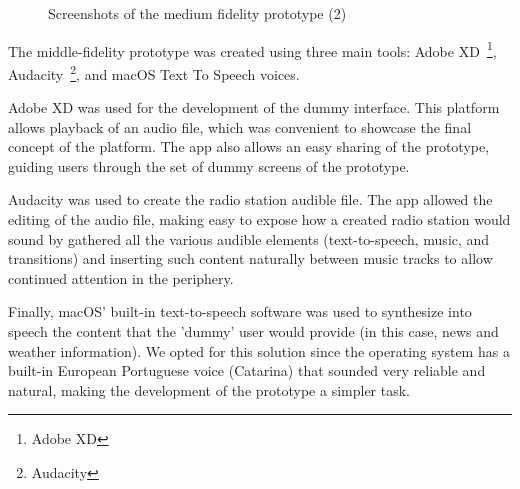 {{\begin{figure}[htbp]
		 \qquad
	\caption{Screenshots of the medium fidelity prototype (2)}
	\label{fig:digitalstoryboard}
\end{figure}



The middle-fidelity prototype was created using three main tools: Adobe XD~\footnote{Adobe XD}, Audacity~\footnote{Audacity}, and macOS Text To Speech voices. 

Adobe XD was used for the development of the dummy interface. This platform allows playback of an audio file, which was convenient to showcase the final concept of the platform. The app also allows an easy sharing of the prototype, guiding users through the set of dummy screens of the prototype. 

Audacity was used to create the radio station audible file. The app allowed the editing of the audio file, making easy to expose how a created radio station would sound by gathered all the various audible elements (text-to-speech, music, and transitions) and inserting such content naturally between music tracks to allow continued attention in the periphery.

Finally, macOS' built-in text-to-speech software was used to synthesize into speech the content that the 'dummy' user would provide (in this case, news and weather information). We opted for this solution since the operating system has a built-in European Portuguese voice (Catarina) that sounded very reliable and natural, making the development of the prototype a simpler task.

}}

